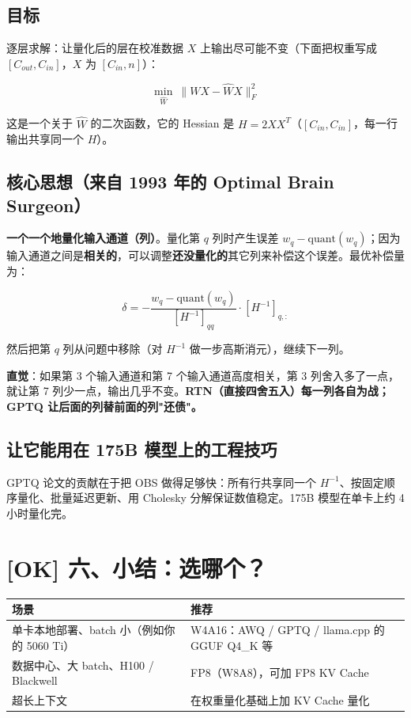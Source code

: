 \subsection{目标}

逐层求解：让量化后的层在校准数据 $X$ 上输出尽可能不变（下面把权重写成 $[C_{out}, C_{in}]$，$X$ 为 $[C_{in}, n]$）：

\[
\min_{\hat{W}} \ \| W X - \hat{W} X \|_F^2
\]

这是一个关于 $\hat{W}$ 的二次函数，它的 Hessian 是 $H = 2 X X^T$（$[C_{in}, C_{in}]$，每一行输出共享同一个 $H$）。

\subsection{核心思想（来自 1993 年的 Optimal Brain Surgeon）}

\textbf{一个一个地量化输入通道（列）}。量化第 $q$ 列时产生误差 $w_q - \text{quant}(w_q)$；因为输入通道之间是\textbf{相关的}，可以调整\textbf{还没量化的}其它列来补偿这个误差。最优补偿量为：

\[
\delta = -\frac{w_q - \text{quant}(w_q)}{[H^{-1}]_{qq}} \cdot [H^{-1}]_{q,:}
\]

然后把第 $q$ 列从问题中移除（对 $H^{-1}$ 做一步高斯消元），继续下一列。

\textbf{直觉}：如果第 3 个输入通道和第 7 个输入通道高度相关，第 3 列舍入多了一点，就让第 7 列少一点，输出几乎不变。\textbf{RTN（直接四舍五入）每一列各自为战；GPTQ 让后面的列替前面的列"还债"。}

\subsection{让它能用在 175B 模型上的工程技巧}

GPTQ 论文的贡献在于把 OBS 做得足够快：所有行共享同一个 $H^{-1}$、按固定顺序量化、批量延迟更新、用 Cholesky 分解保证数值稳定。175B 模型在单卡上约 4 小时量化完。

\section{[OK] 六、小结：选哪个？}

\begin{center}
\small
\begin{tabularx}{\textwidth}{p{3.5cm} X}
\toprule
\textbf{场景} & \textbf{推荐} \\
\midrule
单卡本地部署、batch 小（例如你的 5060 Ti） & W4A16：AWQ / GPTQ / llama.cpp 的 GGUF Q4\_K 等 \\
数据中心、大 batch、H100 / Blackwell & FP8（W8A8），可加 FP8 KV Cache \\
超长上下文 & 在权重量化基础上加 KV Cache 量化 \\
\bottomrule
\end{tabularx}
\end{center}

